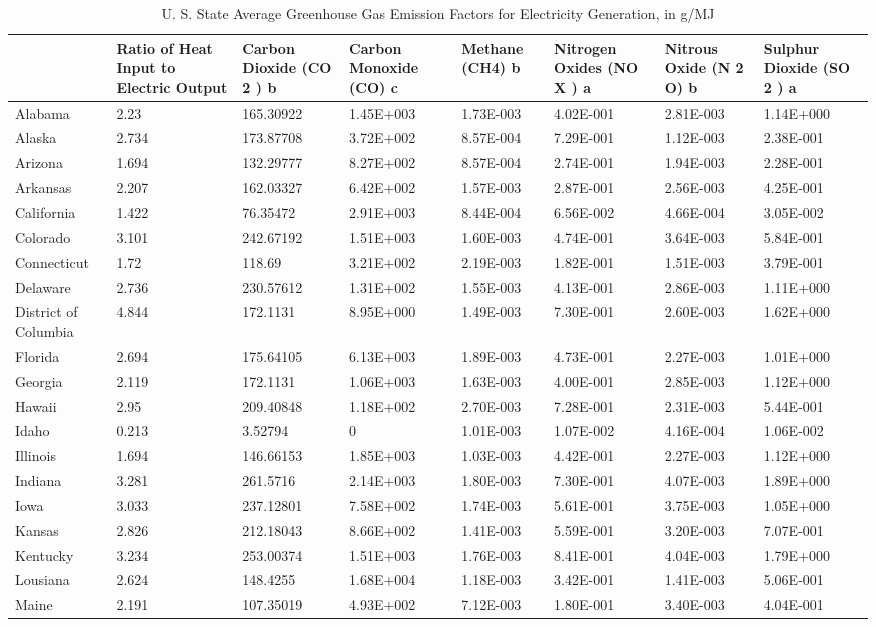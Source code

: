 \begin{longtable}[c]{p{0.75in}p{0.75in}p{0.75in}p{0.75in}p{0.75in}p{0.75in}p{0.75in}p{0.75in}}
\caption{  U. S. State Average Greenhouse Gas Emission Factors for Electricity Generation, in g/MJ \protect \label{table:u.-s.-state-average-greenhouse-gas-emission}}\\
\toprule 
 & Ratio of Heat Input to Electric Output & Carbon Dioxide (CO 2 ) b & Carbon Monoxide (CO) c & Methane (CH4) b & Nitrogen Oxides (NO X ) a & Nitrous Oxide (N 2 O) b & Sulphur Dioxide (SO 2 ) a \tabularnewline \midrule
\endhead
Alabama & 2.23 & 165.30922 & 1.45E+003 & 1.73E-003 & 4.02E-001 & 2.81E-003 & 1.14E+000 \tabularnewline
Alaska & 2.734 & 173.87708 & 3.72E+002 & 8.57E-004 & 7.29E-001 & 1.12E-003 & 2.38E-001 \tabularnewline
Arizona & 1.694 & 132.29777 & 8.27E+002 & 8.57E-004 & 2.74E-001 & 1.94E-003 & 2.28E-001 \tabularnewline
Arkansas & 2.207 & 162.03327 & 6.42E+002 & 1.57E-003 & 2.87E-001 & 2.56E-003 & 4.25E-001 \tabularnewline
California & 1.422 & 76.35472 & 2.91E+003 & 8.44E-004 & 6.56E-002 & 4.66E-004 & 3.05E-002 \tabularnewline
Colorado & 3.101 & 242.67192 & 1.51E+003 & 1.60E-003 & 4.74E-001 & 3.64E-003 & 5.84E-001 \tabularnewline
Connecticut & 1.72 & 118.69 & 3.21E+002 & 2.19E-003 & 1.82E-001 & 1.51E-003 & 3.79E-001 \tabularnewline
Delaware & 2.736 & 230.57612 & 1.31E+002 & 1.55E-003 & 4.13E-001 & 2.86E-003 & 1.11E+000 \tabularnewline
District of Columbia & 4.844 & 172.1131 & 8.95E+000 & 1.49E-003 & 7.30E-001 & 2.60E-003 & 1.62E+000 \tabularnewline
Florida & 2.694 & 175.64105 & 6.13E+003 & 1.89E-003 & 4.73E-001 & 2.27E-003 & 1.01E+000 \tabularnewline
Georgia & 2.119 & 172.1131 & 1.06E+003 & 1.63E-003 & 4.00E-001 & 2.85E-003 & 1.12E+000 \tabularnewline
Hawaii & 2.95 & 209.40848 & 1.18E+002 & 2.70E-003 & 7.28E-001 & 2.31E-003 & 5.44E-001 \tabularnewline
Idaho & 0.213 & 3.52794 & 0 & 1.01E-003 & 1.07E-002 & 4.16E-004 & 1.06E-002 \tabularnewline
Illinois & 1.694 & 146.66153 & 1.85E+003 & 1.03E-003 & 4.42E-001 & 2.27E-003 & 1.12E+000 \tabularnewline
Indiana & 3.281 & 261.5716 & 2.14E+003 & 1.80E-003 & 7.30E-001 & 4.07E-003 & 1.89E+000 \tabularnewline
Iowa & 3.033 & 237.12801 & 7.58E+002 & 1.74E-003 & 5.61E-001 & 3.75E-003 & 1.05E+000 \tabularnewline
Kansas & 2.826 & 212.18043 & 8.66E+002 & 1.41E-003 & 5.59E-001 & 3.20E-003 & 7.07E-001 \tabularnewline
Kentucky & 3.234 & 253.00374 & 1.51E+003 & 1.76E-003 & 8.41E-001 & 4.04E-003 & 1.79E+000 \tabularnewline
Lousiana & 2.624 & 148.4255 & 1.68E+004 & 1.18E-003 & 3.42E-001 & 1.41E-003 & 5.06E-001 \tabularnewline
Maine & 2.191 & 107.35019 & 4.93E+002 & 7.12E-003 & 1.80E-001 & 3.40E-003 & 4.04E-001 \tabularnewline

\end{longtable}
